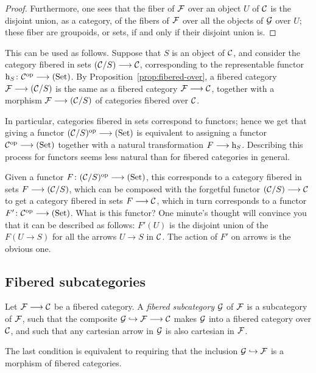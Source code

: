 \begin{3   FIBERED CATEGORIES}
\begin{3.4 Functors and cats fibered in sets}
\begin{proof}
Furthermore, one sees that the fiber of $\mathcal{F}$ over an object $U$ of $\mathcal{C}$ is the disjoint union, as a category, of the fibers of $\mathcal{F}$ over all the objects of $\mathcal{G}$ over $U$; these fiber are groupoids, or sets, if and only if their disjoint union is.
\end{proof}

This can be used as follows. Suppose that $S$ is an object of $\mathcal{C}$, and consider the category fibered in sets $(\cC/S) \arr \cC$, corresponding to the representable functor $\h_S \colon \cC\op \arr \catset$. By Proposition~\ref{prop:fibered-over}, a fibered category $\cF \arr (\cC/S)$ is the same as a fibered category $\cF \arr \cC$, together with a morphism $\cF\arr (\cC/S)$ of categories fibered over $\mathcal{C}$.

In particular, categories fibered in sets correspond to functors; hence we get that giving a functor $(\cC/S)\op \arr \catset$ is equivalent to assigning a functor $\cC\op \arr \catset$ together with a natural transformation $F \arr \h_{S}$. Describing this process for functors seems less natural than for fibered categories in general.

Given a functor $F \colon (\cC/S)\op \arr \catset$, this corresponds to a category fibered in sets $F \arr (\cC/S)$, which can be composed with the forgetful functor $(\cC/S) \arr \cC$ to get a category fibered in sets $F \arr \cC$, which in turn corresponds to a functor $F' \colon \cC\op \arr \catset$. What is this functor? One minute's thought will convince you that it can be described as follows: $F'(U)$ is the disjoint union of the $F(U \to S)$ for all the arrows $U \to S$ in $\mathcal{C}$. The action of $F'$ on arrows is the obvious one.



\subsection{Fibered subcategories}


\begin{definition}
Let $\cF\arr \cC$ be a fibered category. A \emph{fibered subcategory}%
%
 $\mathcal{G}$ of $\mathcal{F}$ is a subcategory of $\mathcal{F}$, such that the composite $\cG \into \cF \arr \cC$ makes $\mathcal{G}$ into a fibered category over $\mathcal{C}$, and such that any cartesian arrow in $\mathcal{G}$ is also cartesian in $\mathcal{F}$.
\end{definition}

The last condition is equivalent to requiring that the inclusion
$\mathcal{G} \hookrightarrow \mathcal{F}$ is a morphism of fibered categories.


\end{3.4 Functors and cats fibered in sets}
\end{3   FIBERED CATEGORIES}
